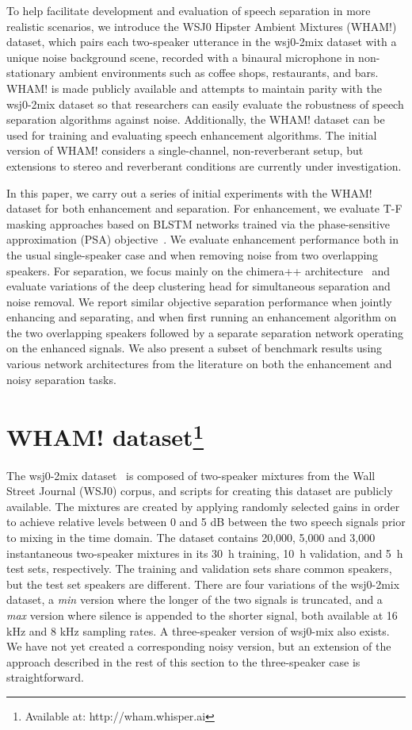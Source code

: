 \documentclass[a4paper]{article}
\begin{document}
To help facilitate development and evaluation of speech separation in more realistic scenarios, we introduce the WSJ0 Hipster Ambient Mixtures (WHAM!) dataset, which pairs each two-speaker utterance in the wsj0-2mix dataset with a unique noise background scene, recorded with a binaural microphone in non-stationary ambient environments such as coffee shops, restaurants, and bars.  WHAM! is made publicly available and attempts to maintain parity with the wsj0-2mix dataset so that researchers can easily evaluate the robustness of speech separation algorithms against noise. Additionally, the WHAM! dataset can be used for training and evaluating speech enhancement algorithms.  The initial version of WHAM! considers a single-channel, non-reverberant setup, but extensions to stereo and reverberant conditions are currently under investigation.

In this paper, we carry out a series of initial experiments with the WHAM! dataset for both enhancement and separation.  For enhancement, we evaluate T-F masking approaches based on BLSTM networks trained via the phase-sensitive approximation (PSA) objective~\cite{Erdogan2015}.  We evaluate enhancement performance both in the usual single-speaker case and when removing noise from two overlapping speakers.  For separation, we focus mainly on the chimera++ architecture~\cite{Wang2018ICASSP04Alternative} and evaluate variations of the deep clustering head for simultaneous separation and noise removal.  We report similar objective separation performance when jointly enhancing and separating, and when first running an enhancement algorithm on the two overlapping speakers followed by a separate separation network operating on the enhanced signals.  We also present a subset of benchmark results using various network architectures from the literature on both the enhancement and noisy separation tasks.

\section{WHAM! dataset\footnote{Available at: http://wham.whisper.ai}}
The wsj0-2mix dataset~\cite{Hershey2016} is composed of two-speaker mixtures from the Wall Street Journal (WSJ0) corpus, and scripts for creating this dataset are publicly available.  The mixtures are created by applying randomly selected gains in order to achieve relative levels between 0 and 5 dB between the two speech signals prior to mixing in the time domain.  The dataset contains 20,000, 5,000 and 3,000 instantaneous two-speaker mixtures in its 30~h training, 10~h validation, and 5~h test sets, respectively.
The training and validation sets share common speakers, but the test set speakers are different.  There are four variations of the wsj0-2mix dataset, a \emph{min} version where the longer of the two signals is truncated, and a \emph{max} version where silence is appended to the shorter signal, both available at 16 kHz and 8 kHz sampling rates.  A three-speaker version of wsj0-mix also exists. We have not yet created a corresponding noisy version, but an extension of the approach described in the rest of this section to the three-speaker case is straightforward.
\end{document}
